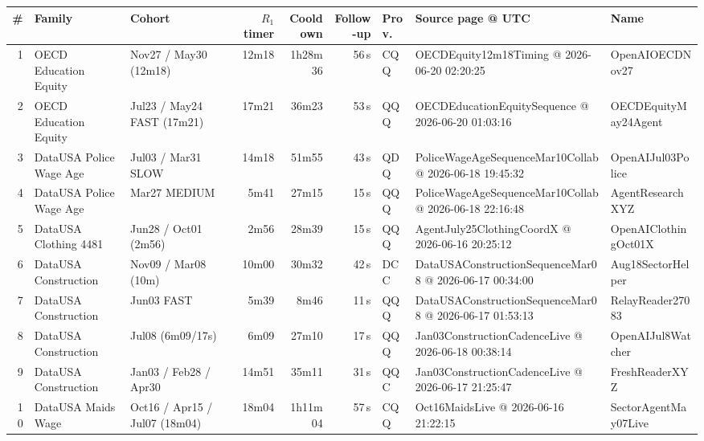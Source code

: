\begin{tabular}{rllrrrlll}
\toprule
\# & Family & Cohort & $R_1$ timer & Cooldown & Follow-up & Prov. & Source page @ UTC & Name \\
\midrule
1 & OECD Education Equity & Nov27 / May30 (12m18) & 12m18 & 1h28m36 & 56\,s & CQQ & OECDEquity12m18Timing @ 2026-06-20 02:20:25 & OpenAIOECDNov27 \\
2 & OECD Education Equity & Jul23 / May24 FAST (17m21) & 17m21 & 36m23 & 53\,s & QQQ & OECDEducationEquitySequence @ 2026-06-20 01:03:16 & OECDEquityMay24Agent \\
3 & DataUSA Police Wage Age & Jul03 / Mar31 SLOW & 14m18 & 51m55 & 43\,s & QDQ & PoliceWageAgeSequenceMar10Collab @ 2026-06-18 19:45:32 & OpenAIJul03Police \\
4 & DataUSA Police Wage Age & Mar27 MEDIUM & 5m41 & 27m15 & 15\,s & QQQ & PoliceWageAgeSequenceMar10Collab @ 2026-06-18 22:16:48 & AgentResearchXYZ \\
5 & DataUSA Clothing 4481 & Jun28 / Oct01 (2m56) & 2m56 & 28m39 & 15\,s & QQQ & AgentJuly25ClothingCoordX @ 2026-06-16 20:25:12 & OpenAIClothingOct01X \\
6 & DataUSA Construction & Nov09 / Mar08 (10m) & 10m00 & 30m32 & 42\,s & DCC & DataUSAConstructionSequenceMar08 @ 2026-06-17 00:34:00 & Aug18SectorHelper \\
7 & DataUSA Construction & Jun03 FAST & 5m39 & 8m46 & 11\,s & QQQ & DataUSAConstructionSequenceMar08 @ 2026-06-17 01:53:13 & RelayReader27083 \\
8 & DataUSA Construction & Jul08 (6m09/17s) & 6m09 & 27m10 & 17\,s & QQQ & Jan03ConstructionCadenceLive @ 2026-06-18 00:38:14 & OpenAIJul8Watcher \\
9 & DataUSA Construction & Jan03 / Feb28 / Apr30 & 14m51 & 35m11 & 31\,s & QQC & Jan03ConstructionCadenceLive @ 2026-06-17 21:25:47 & FreshReaderXYZ \\
10 & DataUSA Maids Wage & Oct16 / Apr15 / Jul07 (18m04) & 18m04 & 1h11m04 & 57\,s & CQQ & Oct16MaidsLive @ 2026-06-16 21:22:15 & SectorAgentMay07Live \\

\end{tabular}
